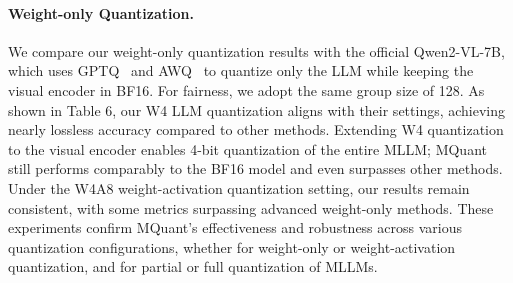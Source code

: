 \paragraph{Weight-only Quantization.} We compare our weight-only quantization results with the official Qwen2-VL-7B, which uses GPTQ~\citep{frantar2022gptq} and AWQ~\citep{lin2023awq} to quantize only the LLM while keeping the visual encoder in BF16. For fairness, we adopt the same group size of 128. As shown in Table 6, our W4 LLM quantization aligns with their settings, achieving nearly lossless accuracy compared to other methods. Extending W4 quantization to the visual encoder enables 4-bit quantization of the entire MLLM; MQuant still performs comparably to the BF16 model and even surpasses other methods. Under the W4A8 weight-activation quantization setting, our results remain consistent, with some metrics surpassing advanced weight-only methods. These experiments confirm MQuant’s effectiveness and robustness across various quantization configurations, whether for weight-only or weight-activation quantization, and for partial or full quantization of MLLMs.

